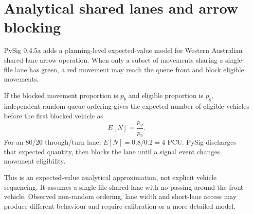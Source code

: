 \chapter{Analytical shared lanes and arrow blocking}
PySig 0.4.5a adds a planning-level expected-value model for Western Australian
shared-lane arrow operation. When only a subset of movements sharing a
single-file lane has green, a red movement may reach the queue front and block
eligible movements.

If the blocked movement proportion is $p_b$ and eligible proportion is $p_g$,
independent random queue ordering gives the expected number of eligible
vehicles before the first blocked vehicle as
\begin{equation}
E[N]=\frac{p_g}{p_b}.
\end{equation}
For an 80/20 through/turn lane, $E[N]=0.8/0.2=4$ PCU. PySig discharges that
expected quantity, then blocks the lane until a signal event changes movement
eligibility.

This is an expected-value analytical approximation, not explicit vehicle
sequencing. It assumes a single-file shared lane with no passing around the
front vehicle. Observed non-random ordering, lane width and short-lane access
may produce different behaviour and require calibration or a more detailed
model.
